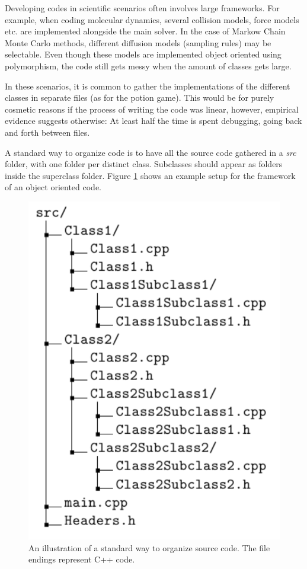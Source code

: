 Developing codes in scientific scenarios often involves large frameworks. For example, when coding molecular dynamics, several collision models, force models etc. are implemented alongside the main solver. In the case of Markow Chain Monte Carlo methods, different diffusion models (sampling rules) may be selectable. Even though these models are implemented object oriented using polymorphism, the code still gets messy when the amount of classes  gets large. 

In these scenarios, it is common to gather the implementations of the different classes in separate files (as for the potion game). This would be for purely cosmetic reasons if the process of writing the code was linear, however, empirical evidence suggests otherwise: At least half the time is spent debugging, going back and forth between files. 

A standard way to organize code is to have all the source code gathered in a \textit{src} folder, with one folder per distinct class. Subclasses should appear as folders inside the superclass folder. Figure \ref{FIG:SRCdirTree} shows an example setup for the framework of an object oriented code.

\begin{figure}[h]
 
 \begin{center}
  \includegraphics[scale=0.6]{../Graphics/SRCfolderStruct.pdf} 
 \end{center}

 \caption{An illustration of a standard way to organize source code. The file endings represent C++ code.}
 \label{FIG:SRCdirTree}
\end{figure}

